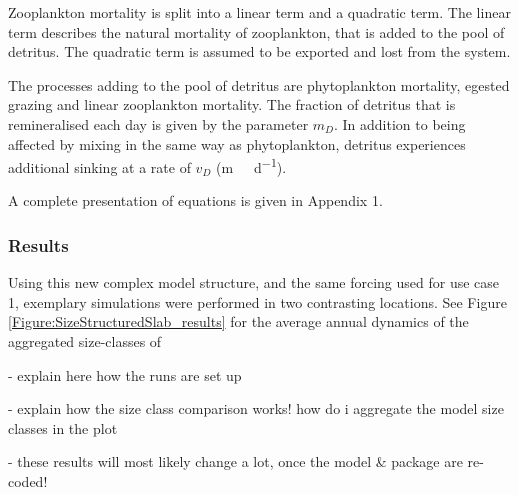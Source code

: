 \documentclass[journal abbreviations, manuscript]{copernicus}
\begin{document}
Zooplankton mortality is split into a linear term and a quadratic term. The linear term describes the natural mortality of zooplankton, that is added to the pool of detritus. The quadratic term is assumed to be exported and lost from the system.

The processes adding to the pool of detritus are phytoplankton mortality, egested grazing and linear zooplankton mortality. The fraction of detritus that is remineralised each day is given by the parameter $m_D$. In addition to being affected by mixing in the same way as phytoplankton, detritus experiences additional sinking at a rate of $v_D$ (\unit{m \ d^{-1}}).

A complete presentation of equations is given in Appendix 1.

\subsubsection{Results}

Using this new complex model structure, and the same forcing used for use case 1, exemplary simulations were performed in two contrasting locations. 
See Figure \ref{Figure:SizeStructuredSlab_results} for the average annual dynamics of the aggregated size-classes of 


- explain here how the runs are set up

- explain how the size class comparison works! how do i aggregate the model size classes in the plot

- these results will most likely change a lot, once the model \& package are re-coded!


\clearpage
\end{document}
